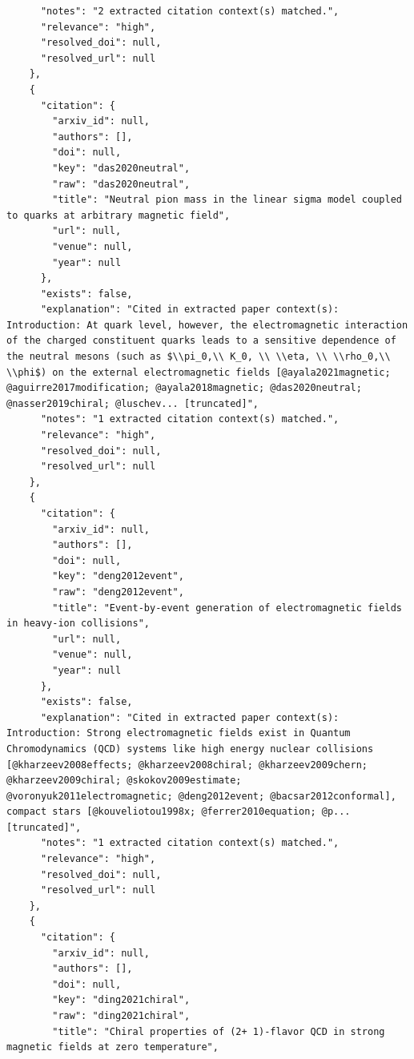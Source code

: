 \documentclass[11pt]{article}
\begin{document}
\begin{verbatim}
      "notes": "2 extracted citation context(s) matched.",
      "relevance": "high",
      "resolved_doi": null,
      "resolved_url": null
    },
    {
      "citation": {
        "arxiv_id": null,
        "authors": [],
        "doi": null,
        "key": "das2020neutral",
        "raw": "das2020neutral",
        "title": "Neutral pion mass in the linear sigma model coupled to quarks at arbitrary magnetic field",
        "url": null,
        "venue": null,
        "year": null
      },
      "exists": false,
      "explanation": "Cited in extracted paper context(s): Introduction: At quark level, however, the electromagnetic interaction of the charged constituent quarks leads to a sensitive dependence of the neutral mesons (such as $\\pi_0,\\ K_0, \\ \\eta, \\ \\rho_0,\\ \\phi$) on the external electromagnetic fields [@ayala2021magnetic; @aguirre2017modification; @ayala2018magnetic; @das2020neutral; @nasser2019chiral; @luschev... [truncated]",
      "notes": "1 extracted citation context(s) matched.",
      "relevance": "high",
      "resolved_doi": null,
      "resolved_url": null
    },
    {
      "citation": {
        "arxiv_id": null,
        "authors": [],
        "doi": null,
        "key": "deng2012event",
        "raw": "deng2012event",
        "title": "Event-by-event generation of electromagnetic fields in heavy-ion collisions",
        "url": null,
        "venue": null,
        "year": null
      },
      "exists": false,
      "explanation": "Cited in extracted paper context(s): Introduction: Strong electromagnetic fields exist in Quantum Chromodynamics (QCD) systems like high energy nuclear collisions [@kharzeev2008effects; @kharzeev2008chiral; @kharzeev2009chern; @kharzeev2009chiral; @skokov2009estimate; @voronyuk2011electromagnetic; @deng2012event; @bacsar2012conformal], compact stars [@kouveliotou1998x; @ferrer2010equation; @p... [truncated]",
      "notes": "1 extracted citation context(s) matched.",
      "relevance": "high",
      "resolved_doi": null,
      "resolved_url": null
    },
    {
      "citation": {
        "arxiv_id": null,
        "authors": [],
        "doi": null,
        "key": "ding2021chiral",
        "raw": "ding2021chiral",
        "title": "Chiral properties of (2+ 1)-flavor QCD in strong magnetic fields at zero temperature",

\end{verbatim}
\end{document}
